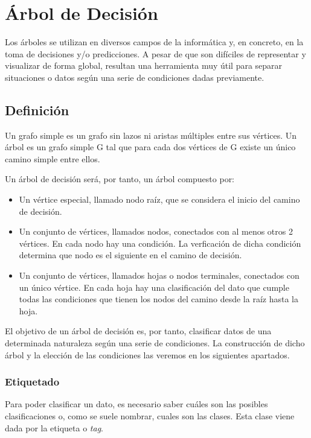 \documentclass[12pt,a4paper]{article}
\begin{document}
	\newpage
	\section{\'Arbol de Decisi\'on}\label{sec:Decision_tree}
	
		Los \'arboles se utilizan en diversos campos de la inform\'atica y, en concreto, en la toma de decisiones y/o predicciones. A pesar de que son dif\'iciles de representar y visualizar de forma global, resultan una herramienta muy \'util para separar situaciones o datos seg\'un una serie de condiciones dadas previamente.
		
		\subsection{Definici\'on}
			Un grafo simple es un grafo sin lazos ni aristas m\'ultiples entre sus v\'ertices. Un \'arbol es un grafo simple G tal que
			para cada dos v\'ertices de G existe un \'unico camino simple entre ellos.
			
			Un \'arbol de decisi\'on ser\'a, por tanto, un \'arbol compuesto por:
			\begin{itemize}
				\item Un v\'ertice especial, llamado nodo ra\'iz, que se considera el inicio del camino de decisi\'on.
				\item Un conjunto de v\'ertices, llamados nodos, conectados con al menos otros 2 v\'ertices. En cada nodo hay una condici\'on. La verficaci\'on de dicha condici\'on determina que nodo es el siguiente en el camino de decisi\'on.
				\item Un conjunto de v\'ertices, llamados hojas o nodos terminales, conectados con un \'unico v\'ertice. En cada hoja hay una clasificaci\'on del dato que cumple todas las condiciones que tienen los nodos del camino desde la ra\'iz hasta la hoja. 
			\end{itemize}
			
			El objetivo de un \'arbol de decisi\'on es, por tanto, clasificar datos de una determinada naturaleza seg\'un una serie de condiciones. La construcci\'on de dicho \'arbol y la elecci\'on de las condiciones las veremos en los siguientes apartados.
			 
			\subsubsection{Etiquetado}
			Para poder clasificar un dato, es necesario saber cu\'ales son las posibles clasificaciones o, como se suele nombrar, cuales son las clases. Esta clase viene dada por la etiqueta o \textit{tag}. 
			
\end{document}
